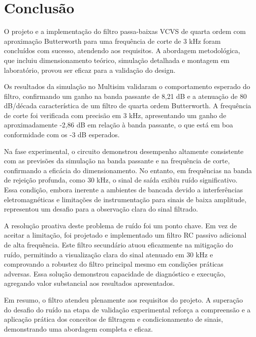\section{Conclusão}

O projeto e a implementação do filtro passa-baixas VCVS de quarta ordem com aproximação Butterworth para uma frequência de corte de 3 kHz foram concluídos com sucesso, atendendo aos requisitos. A abordagem metodológica, que incluiu dimensionamento teórico, simulação detalhada e montagem em laboratório, provou ser eficaz para a validação do design.

Os resultados da simulação no Multisim\textregistered{} validaram o comportamento esperado do filtro, confirmando um ganho na banda passante de 8,21 dB e a atenuação de 80 dB/década característica de um filtro de quarta ordem Butterworth. A frequência de corte foi verificada com precisão em 3 kHz, apresentando um ganho de aproximadamente -2,86 dB em relação à banda passante, o que está em boa conformidade com os -3 dB esperados.

Na fase experimental, o circuito demonstrou desempenho altamente consistente com as previsões da simulação na banda passante e na frequência de corte, confirmando a eficácia do dimensionamento. No entanto, em frequências na banda de rejeição profunda, como 30 kHz, o sinal de saída exibiu ruído significativo. Essa condição, embora inerente a ambientes de bancada devido a interferências eletromagnéticas e limitações de instrumentação para sinais de baixa amplitude, representou um desafio para a observação clara do sinal filtrado.

A resolução proativa deste problema de ruído foi um ponto chave. Em vez de aceitar a limitação, foi projetado e implementado um filtro RC passivo adicional de alta frequência. Este filtro secundário atuou eficazmente na mitigação do ruído, permitindo a visualização clara do sinal atenuado em 30 kHz e comprovando a robustez do filtro principal mesmo em condições práticas adversas. Essa solução demonstrou capacidade de diagnóstico e execução, agregando valor substancial aos resultados apresentados.

Em resumo, o filtro atendeu plenamente aos requisitos do projeto. A superação do desafio do ruído na etapa de validação experimental reforça a compreensão e a aplicação prática dos conceitos de filtragem e condicionamento de sinais, demonstrando uma abordagem completa e eficaz.

\nocite{boylestad, malvino}
